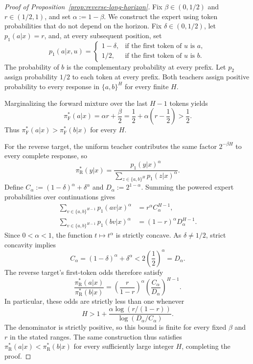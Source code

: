 \documentclass[11pt]{article}
\newcommand{\pif}{\pi_{\mathrm{F}}}
\newcommand{\pir}{\pi_{\mathrm{R}}}
\begin{document}
\begin{proof}[Proof of Proposition~\ref{prop:reverse-long-horizon}]
Fix $\beta\in(0,1/2)$ and $r\in(1/2,1)$, and set $\alpha:=1-\beta$. We construct the expert using token probabilities that do not depend on the horizon. Fix $\delta\in(0,1/2)$, let $p_1(a|x)=r$, and, at every subsequent position, set
\[
    p_1(a|x,u)=
    \begin{cases}
        1-\delta, & \text{if the first token of $u$ is $a$},\\
        1/2, & \text{if the first token of $u$ is $b$}.
    \end{cases}
\]
The probability of $b$ is the complementary probability at every prefix. Let $p_2$ assign probability $1/2$ to each token at every prefix. Both teachers assign positive probability to every response in $\{a,b\}^H$ for every finite $H$.

Marginalizing the forward mixture over the last $H-1$ tokens yields
\[
    \pif^*(a|x)=\alpha r+\frac{\beta}{2}
    =\frac12+\alpha\left(r-\frac12\right)>\frac12.
\]
Thus $\pif^*(a|x)>\pif^*(b|x)$ for every $H$.

For the reverse target, the uniform teacher contributes the same factor $2^{-\beta H}$ to every complete response, so
\[
    \pir^*(y|x)=\frac{p_1(y|x)^\alpha}
    {\sum_{z\in\{a,b\}^H}p_1(z|x)^\alpha}.
\]
Define $C_\alpha:=(1-\delta)^\alpha+\delta^\alpha$ and $D_\alpha:=2^{1-\alpha}$. Summing the powered expert probabilities over continuations gives
\begin{align*}
    \sum_{v\in\{a,b\}^{H-1}}p_1(av|x)^\alpha
    &=r^\alpha C_\alpha^{H-1},\\
    \sum_{v\in\{a,b\}^{H-1}}p_1(bv|x)^\alpha
    &=(1-r)^\alpha D_\alpha^{H-1}.
\end{align*}
Since $0<\alpha<1$, the function $t\mapsto t^\alpha$ is strictly concave. As $\delta\neq1/2$, strict concavity implies
\[
    C_\alpha=(1-\delta)^\alpha+\delta^\alpha
    <2\left(\frac12\right)^\alpha=D_\alpha.
\]
The reverse target's first-token odds therefore satisfy
\[
    \frac{\pir^*(a|x)}{\pir^*(b|x)}
    =\left(\frac{r}{1-r}\right)^\alpha
      \left(\frac{C_\alpha}{D_\alpha}\right)^{H-1}.
\]
In particular, these odds are strictly less than one whenever
\[
    H>1+\frac{\alpha\log(r/(1-r))}{\log(D_\alpha/C_\alpha)}.
\]
The denominator is strictly positive, so this bound is finite for every fixed $\beta$ and $r$ in the stated ranges. The same construction thus satisfies $\pir^*(a|x)<\pir^*(b|x)$ for every sufficiently large integer $H$, completing the proof.
\end{proof}
\end{document}
